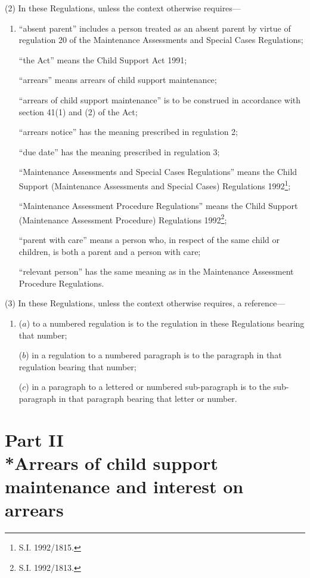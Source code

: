 \documentclass[12pt,a4paper]{article}
\begin{document}
(2) In these Regulations, unless the context otherwise requires—
\begin{enumerate}\item[]
“absent parent” includes a person treated as an absent parent by virtue of regulation 20 of the Maintenance Assessments and Special Cases Regulations;

“the Act” means the Child Support Act 1991;

“arrears” means arrears of child support maintenance;

“arrears of child support maintenance” is to be construed in accordance with section 41(1) and (2) of the Act;

“arrears notice” has the meaning prescribed in regulation 2;

“due date” has the meaning prescribed in regulation 3;

“Maintenance Assessments and Special Cases Regulations” means the Child Support (Maintenance Assessments and Special Cases) Regulations 1992\footnote{\frenchspacing S.I. 1992/1815.};

“Maintenance Assessment Procedure Regulations” means the Child Support (Maintenance Assessment Procedure) Regulations 1992\footnote{\frenchspacing S.I. 1992/1813.};

“parent with care” means a person who, in respect of the same child or children, is both a parent and a person with care;

“relevant person” has the same meaning as in the Maintenance Assessment Procedure Regulations.
\end{enumerate}

(3) In these Regulations, unless the context otherwise requires, a reference—
\begin{enumerate}\item[]
($a$) to a numbered regulation is to the regulation in these Regulations bearing that number;

($b$) in a regulation to a numbered paragraph is to the paragraph in that regulation bearing that number;

($c$) in a paragraph to a lettered or numbered sub-paragraph is to the sub-paragraph in that paragraph bearing that letter or number.
\end{enumerate}

\section[Part II --- Arrears of child support maintenance and interest on arrears]{Part II\\*Arrears of child support maintenance and interest on arrears}
\end{document}
